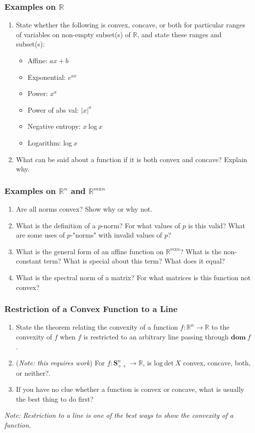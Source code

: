 \documentclass[]{article}
\newcommand{\R}{\mathbb{R}}
\newcommand{\Rn}{\mathbb{R}^{n}}
\newcommand{\Rmn}{\mathbb{R}^{m\text{x}n}}
\newcommand{\Snpp}{\boldsymbol{S}^{n}_{++}}
\newcounter{q}
\begin{document}
\subsubsection*{Examples on $\R$}
\begin{enumerate}[resume*]
\item State whether the following is convex, concave, or both for particular ranges of variables on non-empty subset(s) of $\R$, and state these ranges and subset(s):
\begin{itemize}
	\item Affine: $ax+b$
	\item Exponential: $e^{ax}$
	\item Power: $x^{a}$
	\item Power of abs val: $|x|^{a}$
	\item Negative entropy: $x\:$log$\:x$
	\item Logarithm: log$\:x$
\end{itemize}
\item What can be said about a function if it is both convex and concave? Explain why.
\end{enumerate}

\subsubsection*{Examples on $\Rn$ and $\Rmn$}
\begin{enumerate}[resume*]
\item Are all norms convex? Show why or why not.
\item What is the definition of a $p$-norm? For what values of $p$ is this valid? What are some uses of $p$-"norms" with invalid values of $p$?
\item What is the general form of an affine function on $\Rmn$? What is the non-constant term? What is special about this term? What does it equal?
\item What is the spectral norm of a matrix? For what matrices is this function not convex?
\end{enumerate}

\subsubsection*{Restriction of a Convex Function to a Line}
\begin{enumerate}[resume*]
\item State the theorem relating the convexity of a function $f: \Rn \rightarrow \R$ to the convexity of $f$ when $f$ is restricted to an arbitrary line passing through $\textbf{dom}\: f$.
\item (\textit{Note: this requires work}) For $f: \Snpp \rightarrow \R$, is $\text{log}\:\text{det}\:X$ convex, concave, both, or neither?.
\item If you have no clue whether a function is convex or concave, what is usually the best thing to do first?
\end{enumerate}
\textit{Note: Restriction to a line is one of the best ways to show the convexity of a function.}
\end{document}
